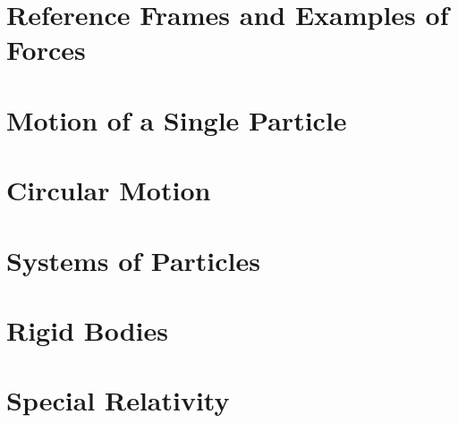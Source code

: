 \documentclass[british,11pt,a4paper]{report}
\begin{document}
\maketitle
\tableofcontents
\chapter{Reference Frames and Examples of Forces}

\chapter{Motion of a Single Particle}

\chapter{Circular Motion}
\chapter{Systems of Particles}
\chapter{Rigid Bodies}
\chapter{Special Relativity}
\end{document}

